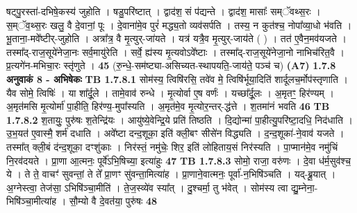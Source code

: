 \documentclass[17pt]{extarticle}
\begin{document}
                  षट्पु॒रस्ता॑-दभिषे॒कस्य॑ जुहोति । षडु॒परि॑ष्टात् । द्वाद॑श॒ सं प॑द्यन्ते । द्वाद॑श॒ मासाः᳚ सम्ॅवथ्स॒रः । स॒म्ॅव॒थ्स॒रः खलु॒ वै दे॒वानां॒ पूः । दे॒वाना॑मे॒व पुरं॑ मद्ध्य॒तो व्यव॑सर्पति । तस्य॒ न कुत॑श्च॒ नोपा᳚व्या॒धो भ॑वति । भू॒ताना॒-मवे᳚ष्टीर्-जुहोति । अत्रा᳚त्र॒ वै मृ॒त्युर्-जा॑यते । यत्र॑ यत्रै॒व मृ॒त्युर्-जाय॑ते ( ) । तत॑ ए॒वैन॒मव॑यजते । तस्मा᳚द्-राज॒सूये॑नेजा॒नः सर्व॒मायु॑रेति । सर्वे॒ ह्य॑स्य मृ॒त्यवोऽवे᳚ष्टाः । तस्मा᳚द्-राज॒सूये॑नेजा॒नो नाभिच॑रित॒वै । प्र॒त्यगे॑न-मभिचा॒रः स्तृ॑णुते । \textbf{ 45} \newline
                  \newline
                                    (रु॒न्धे॒-सम॑ष्ट्या-असिच्यत-स्थापयति॒-जाय॑ते॒ पञ्च॑ च) \textbf{(A7)} \newline \newline
                \textbf{ 1.7.8     अनुवाकं   8 - अभिषेकः} \newline
                                \textbf{ TB 1.7.8.1} \newline
                  सोम॑स्य॒ त्विषि॑रसि॒ तवे॑व मे॒ त्विषि॑र्भूया॒दिति॑ शार्दूलच॒र्मोप॑स्तृणाति । यैव सोमे॒ त्विषिः॑ । या शा᳚र्दू॒ले । तामे॒वाव॑ रुन्धे । मृ॒त्योर्वा ए॒ष वर्णः॑ । यच्छा᳚र्दू॒लः । अ॒मृतꣳ॒॒ हिर॑ण्यम् । अ॒मृत॑मसि मृ॒त्योर्मा॑ पा॒हीति॒ हिर॑ण्य॒-मुपा᳚स्यति । अ॒मृत॑मे॒व मृ॒त्योर॒न्तर्-द्ध॑त्ते । श॒तमा॑नं भवति \textbf{ 46} \newline
                  \newline
                                \textbf{ TB 1.7.8.2} \newline
                  श॒तायुः॒ पुरु॑षः श॒तेन्द्रि॑यः । आयु॑ष्ये॒वेन्द्रि॒ये प्रति॑ तिष्ठति । दि॒द्योन्मा॑ पा॒हीत्यु॒परि॑ष्टा॒दधि॒ निद॑धाति । उ॒भ॒यत॑ ए॒वास्मै॒ शर्म॑ दधाति । अवे᳚ष्टा दन्द॒शूका॒ इति॑ क्ली॒बꣳ सीसे॑न विद्ध्यति । द॒न्द॒शूका॑-ने॒वाव॑ यजते । तस्मा᳚त् क्ली॒बं द॑न्द॒शूका॒ दꣳशु॑काः । निर॑स्तं॒ नमु॑चेः॒ शिर॒ इति॑ लोहिताय॒सं निर॑स्यति । पा॒प्मान॑मे॒व नमु॑चिं नि॒रव॑दयते । प्रा॒णा आ॒त्मनः॒ पूर्वे॑ऽभि॒षिच्या॒ इत्या॑हुः \textbf{ 47} \newline
                  \newline
                                \textbf{ TB 1.7.8.3} \newline
                  सोमो॒ राजा॒ वरु॑णः । दे॒वा ध॑र्म॒सुव॑श्च॒ ये । ते ते॒ वाचꣳ॑ सुवन्तां॒ ते ते᳚ प्रा॒णꣳ सु॑वन्ता॒मित्या॑ह । प्रा॒णाने॒वात्मनः॒ पूर्वा॑-न॒भिषि॑ञ्चति । यद्-ब्रू॒यात् । अ॒ग्नेस्त्वा॒ तेज॑सा॒ ऽभिषि॑ञ्चा॒मीति॑ । ते॒ज॒स्व्ये॑व स्या᳚त् । दु॒श्चर्मा॒ तु भ॑वेत् । सोम॑स्य त्वा द्यु॒म्नेना॒-भिषि॑ञ्चा॒मीत्या॑ह । सौ॒म्यो वै दे॒वत॑या॒ पुरु॑षः \textbf{ 48} \newline
\end{document}
